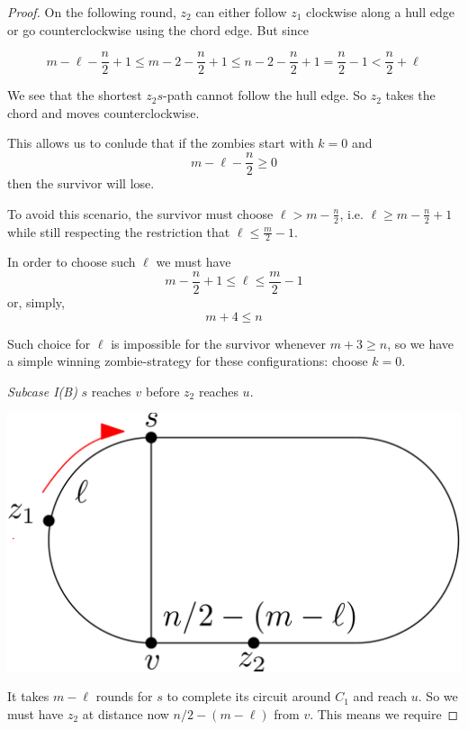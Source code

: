 \documentclass[letterpaper, 10pt]{article}
\begin{document}
\begin{proof}
On the following round, $z_2$ can either follow $z_1$ clockwise along a hull edge or go
counterclockwise using the chord edge. But since

\[ m - \ell - \frac{n}{2} +1 \leq m - 2 -\frac{n}{2}  +1 \leq n - 2 - \frac{n}{2} +1 = \frac{n}{2} -1 < \frac{n}{2} + \ell\]

We see that the shortest $z_2s$-path cannot follow the hull edge.
So $z_2$ takes the chord and moves counterclockwise.


This allows us to conlude that if the zombies start with $k=0$ and
\[ m - \ell -\frac{n}{2}  \geq 0 \]
then the survivor will lose.

To avoid this scenario, the survivor must choose $\ell > m - \frac{n}{2}$,
i.e. $\ell \geq m - \frac{n}{2} +1$
while still respecting the restriction that $\ell \leq \frac{m}{2}-1$.

In order to choose such $\ell$ we must have
\[ m - \frac{n}{2} +1 \leq \ell \leq \frac{m}{2} -1 \]
or, simply,
\[ m + 4 \leq n \]

Such choice for $\ell$ is impossible for the survivor whenever
$m+3 \geq n$, so we have a simple winning zombie-strategy for these configurations:
choose $k=0$.

\emph{Subcase I(B)} $s$ reaches $v$ before $z_2$ reaches $u$.

\begin{center}
\includegraphics[scale=0.15]{diagramCaseIB_1}
\end{center}

It takes $m-\ell$ rounds for $s$ to complete its circuit around $C_1$ and reach $u$. So
we must have $z_2$ at distance now $n/2 - (m-\ell)$ from $v$. This means we require


\end{proof}
\end{document}
